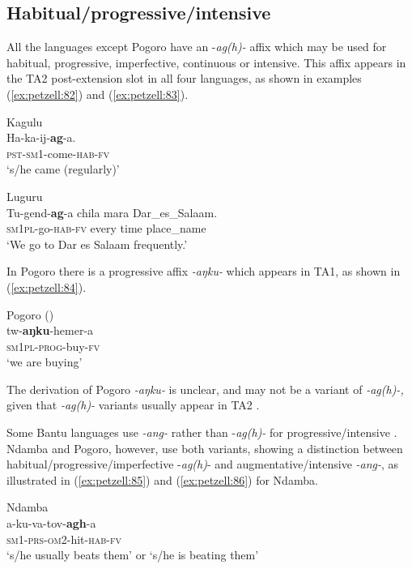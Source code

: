 \documentclass[output=paper,
            colorlinks, citecolor=brown
            ,draftmode
		  ]{langscibook}
\begin{document}
\subsection{Habitual/progressive/intensive}
\label{sec:petzell:4.5}
All the languages except Pogoro have an -\textit{ag(h)-} affix which may be used for habitual, progressive, imperfective, continuous or intensive. This affix appears in the TA2 post-extension slot in all four languages, as shown in examples (\ref{ex:petzell:82}) and (\ref{ex:petzell:83}).


\ea\label{ex:petzell:82}Kagulu\\
\gll Ha-ka-ij-\textbf{ag}{}-a.\\
\textsc{pst}{}-\textsc{sm1}{}-come-\textsc{{hab}}{}-\textsc{fv}\\
\glt `s/he came (regularly)'


\ex\label{ex:petzell:83}Luguru\\
\gll Tu-gend-\textbf{ag}{}-a       chila  mara  Dar\_es\_Salaam. \\
\textsc{sm}1\textsc{pl}{}-go-\textsc{{hab}}{}-\textsc{fv}    every  time  place\_name\\
\glt `We go to Dar es Salaam frequently.'
\z



In Pogoro there is a progressive affix \textit{{}-aŋku-} which appears in TA1, as shown in  (\ref{ex:petzell:84}).


\ea\label{ex:petzell:84}Pogoro (\citealt[Appendix 1, p.176]{Nurse2008})\\
\gll tw-\textbf{aŋku}{}-hemer-a \\
\textsc{sm}1\textsc{pl}{}-\textsc{{prog}}{}-buy-\textsc{fv}\\
\glt `we are buying'
\z


The derivation of Pogoro \textit{{}-aŋku-} is unclear, and may not be a variant of \textit{{}-ag(h)-,} given that \textit{{}-ag(h)-} variants usually appear in TA2 \citep[110]{Meeussen1967}.



Some Bantu languages use \textit{{}-ang-} rather than -\textit{ag(h)-} for progressive\slash intensive \citep[263]{Nurse2008}. Ndamba and Pogoro, however, use both variants, showing a distinction between habitual\slash progressive\slash imperfective -\textit{ag(h)}{}- and augmentative\slash intensive \textit{{}-ang-}, as illustrated in  (\ref{ex:petzell:85}) and (\ref{ex:petzell:86}) for Ndamba.


\ea\label{ex:petzell:85}Ndamba\\
\gll a-ku-va-tov-\textbf{agh}{}-a  \\
\textsc{sm}1-\textsc{prs}{}-\textsc{om}2-hit-\textsc{{hab}}{}-\textsc{fv}\\
\glt `s/he usually beats them' or `s/he is beating them'
\end{document}

